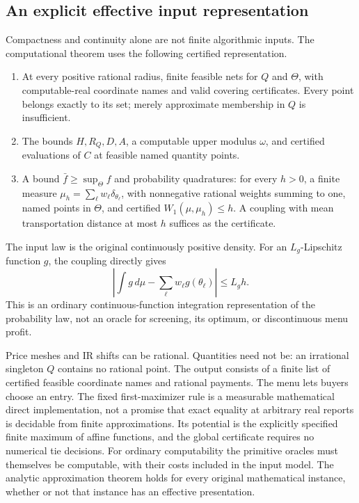 \documentclass[11pt,a4paper]{article}
\numberwithin{equation}{section}
\begin{document}
\subsection{An explicit effective input representation}
Compactness and continuity alone are not finite algorithmic inputs.
The computational theorem uses the following certified representation.
\begin{enumerate}
\item At every positive rational radius, finite feasible nets for
  \(Q\) and \(\Theta\), with computable-real coordinate names and valid
  covering certificates. Every point belongs exactly to its set;
  merely approximate membership in \(Q\) is insufficient.
\item The bounds \(H,R_Q,D,A\), a computable upper modulus \(\omega\),
  and certified evaluations of \(C\) at feasible named quantity points.
\item A bound \(\bar f\ge\sup_\Theta f\) and probability quadratures:
  for every \(h>0\), a finite measure
  \(\mu_h=\sum_\ell w_\ell\delta_{\theta_\ell}\), with nonnegative
  rational weights summing to one, named points in \(\Theta\), and
  certified \(W_1(\mu,\mu_h)\le h\). A coupling with mean transportation
  distance at most \(h\) suffices as the certificate.
\end{enumerate}
The input law is the original continuously positive density.
For an \(L_g\)-Lipschitz function \(g\), the coupling directly gives
\begin{equation}\label{eq:quadrature}
 \left|\int g\,d\mu-\sum_\ell w_\ell g(\theta_\ell)\right|\le L_gh.
\end{equation}
This is an ordinary continuous-function integration representation of
the probability law, not an oracle for screening, its optimum, or
discontinuous menu profit.

Price meshes and IR shifts can be rational. Quantities need not be:
an irrational singleton \(Q\) contains no rational point.
The output consists of a finite list of certified feasible coordinate
names and rational payments. The menu lets buyers choose an entry.
The fixed first-maximizer rule is a measurable mathematical direct
implementation, not a promise that exact equality at arbitrary real
reports is decidable from finite approximations.
Its potential is the explicitly specified finite maximum of affine
functions, and the global certificate requires no numerical tie decisions.
For ordinary computability the primitive oracles must themselves be
computable, with their costs included in the input model.
The analytic approximation theorem holds for every original mathematical
instance, whether or not that instance has an effective presentation.
\end{document}
